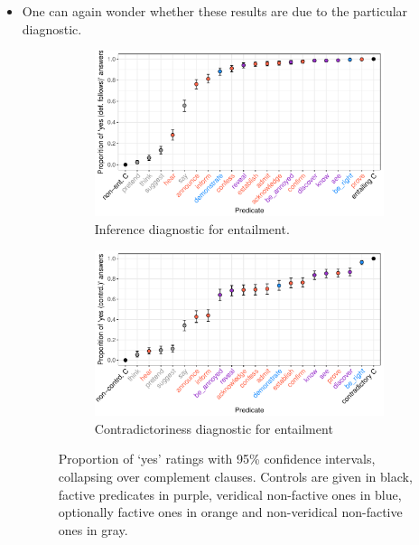 \documentclass[11pt,fleqn]{article}
\newcommand{\6}{\mbox{$[\hspace*{-.6mm}[$}}
\newcommand{\9}{\mbox{$]\hspace*{-.6mm}]$}}
\begin{document}
{\begin{itemize}
\item One can again wonder whether these results are due to the particular diagnostic. 


\begin{figure}[H]
\centering

\begin{subfigure}{1\textwidth}
\centering
\includegraphics[width=.7\paperwidth]{../results/7-veridicality3-binary/graphs/proportion-by-predicate-variability}
\caption{Inference diagnostic for entailment.}
\end{subfigure}

\begin{subfigure}{1\textwidth}
\centering
\includegraphics[width=.7\paperwidth]{../results/6-veridicality2-binary/graphs/proportion-by-predicate-variability}
\caption{Contradictoriness diagnostic for entailment}
\end{subfigure} 

\caption{Proportion of `yes' ratings with 95\% confidence intervals, collapsing over complement clauses. Controls are given in black, factive predicates in purple, veridical non-factive ones in blue, optionally factive ones in orange and non-veridical non-factive ones in gray.}
\label{f-binary}
\end{figure}



\end{itemize}}
\end{document}
